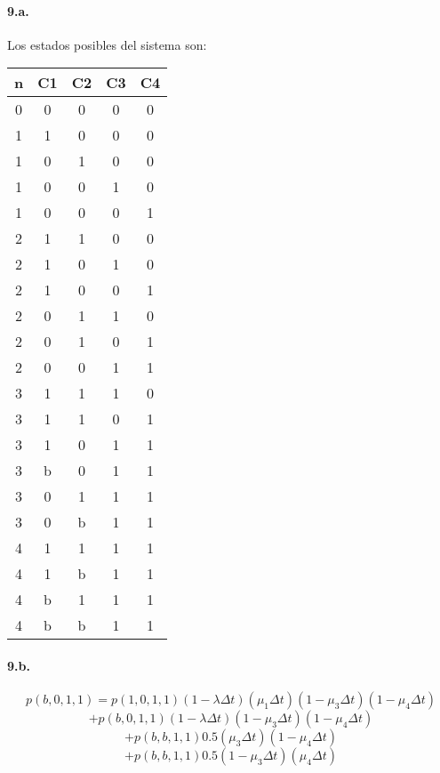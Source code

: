 \documentclass{article}
\begin{document}
   \paragraph{9.a.} Los estados posibles del sistema son:
   \begin{center}
   \begin{tabular}{|| c | c | c | c | c ||}
   \hline 
      n & C1 & C2 & C3 & C4 \\ \hline \hline
      0 & 0  & 0  & 0  & 0  \\ \hline \hline
      1 & 1  & 0  & 0  & 0  \\ \hline 
      1 & 0  & 1  & 0  & 0  \\ \hline
      1 & 0  & 0  & 1  & 0  \\ \hline
      1 & 0  & 0  & 0  & 1  \\ \hline \hline
      2 & 1  & 1  & 0  & 0  \\ \hline
      2 & 1  & 0  & 1  & 0  \\ \hline
      2 & 1  & 0  & 0  & 1  \\ \hline
      2 & 0  & 1  & 1  & 0  \\ \hline
      2 & 0  & 1  & 0  & 1  \\ \hline
      2 & 0  & 0  & 1  & 1  \\ \hline \hline
      3 & 1  & 1  & 1  & 0  \\ \hline
      3 & 1  & 1  & 0  & 1  \\ \hline
      3 & 1  & 0  & 1  & 1  \\ \hline
      3 & b  & 0  & 1  & 1  \\ \hline
      3 & 0  & 1  & 1  & 1  \\ \hline
      3 & 0  & b  & 1  & 1  \\ \hline \hline
      4 & 1  & 1  & 1  & 1  \\ \hline
      4 & 1  & b  & 1  & 1  \\ \hline
      4 & b  & 1  & 1  & 1  \\ \hline
      4 & b  & b  & 1  & 1  \\ \hline
   \end{tabular}
   \end{center}

   \paragraph{9.b.}
      $$p(b,0,1,1) = p(1,0,1,1) (1 - \lambda \Delta t) (\mu_1 \Delta t) (1 - \mu_3 \Delta t) (1 - \mu_4 \Delta t)$$
      $$           + p(b,0,1,1) (1 - \lambda \Delta t) (1 - \mu_3 \Delta t) (1 - \mu_4 \Delta t)$$
      $$           + p(b,b,1,1) 0.5 (\mu_3 \Delta t) (1 - \mu_4 \Delta t) $$
      $$           + p(b,b,1,1) 0.5 (1 - \mu_3 \Delta t) (\mu_4 \Delta t) $$
\end{document}
